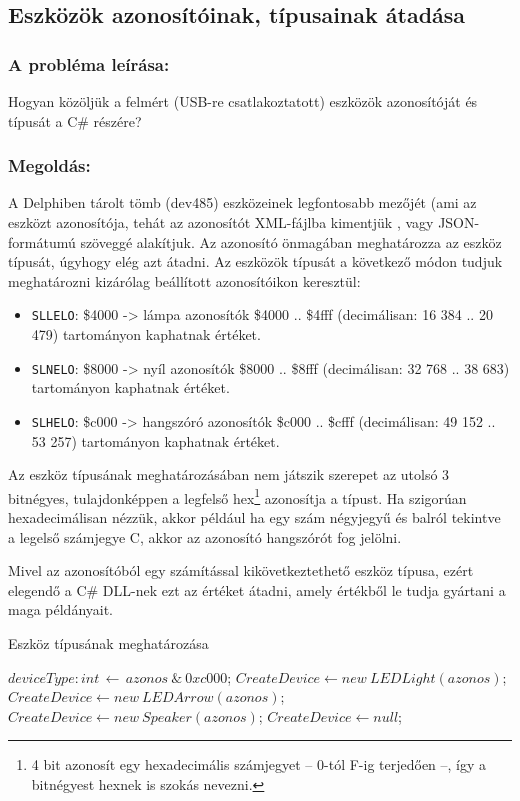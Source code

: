 \documentclass[tocnopagenum]{thesis-ekf}
\theoremstyle{definition}
\theoremstyle{remark}
\begin{document}
	\subsection{Eszközök azonosítóinak, típusainak átadása}
	\subsubsection{A probléma leírása:} Hogyan közöljük a felmért (USB-re csatlakoztatott) eszközök azonosítóját és típusát a C\# részére?
	\subsubsection{Megoldás:}
	A Delphiben tárolt tömb (dev485) eszközeinek legfontosabb mezőjét (ami az eszközt azonosítója, tehát az azonosítót XML-fájlba kimentjük \cite{sof_xmlcreate}, vagy JSON-formátumú szöveggé alakítjuk. Az azonosító önmagában meghatározza az eszköz típusát, úgyhogy elég azt átadni.
	Az eszközök típusát a következő módon tudjuk meghatározni kizárólag beállított azonosítóikon keresztül:
	\begin{itemize}
		\item \verb*|SLLELO|: \$4000 -> lámpa azonosítók \$4000 .. \$4fff (decimálisan: 16 384 .. 20 479) tartományon kaphatnak értéket.
		\item \verb*|SLNELO|: \$8000 -> nyíl azonosítók \$8000 .. \$8fff (decimálisan: 32 768 .. 38 683) tartományon kaphatnak értéket.
		\item \verb*|SLHELO|: \$c000 -> hangszóró azonosítók \$c000 .. \$cfff (decimálisan: 49 152 .. 53 257) tartományon kaphatnak értéket.
	\end{itemize}
	
	Az eszköz típusának meghatározásában nem játszik szerepet az utolsó 3 bitnégyes, tulajdonképpen a legfelső hex\footnote{4 bit azonosít egy hexadecimális számjegyet -- 0-tól F-ig terjedően --, így a bitnégyest hexnek is szokás nevezni.} azonosítja a típust.
	Ha szigorúan hexadecimálisan nézzük, akkor például ha egy szám négyjegyű és balról tekintve a legelső számjegye C, akkor az azonosító hangszórót fog jelölni.
	
	Mivel az azonosítóból egy számítással kikövetkeztethető eszköz típusa, ezért elegendő a C\# DLL-nek ezt az értéket átadni, amely értékből le tudja gyártani a maga példányait.
	\begin{algorithm}
		\caption{Eszköz típusának meghatározása}
		\label{algo:createdevice}
		\begin{algorithmic}[0]
			\State $deviceType:int\,\gets\,azonos\ \mathbin{\&}\ 0xc000$; 
				\State $CreateDevice \gets new\ LEDLight(azonos)$;
				\State $CreateDevice \gets new\ LEDArrow(azonos)$;
				\State $CreateDevice \gets new\ Speaker(azonos)$;
			\Else
				\State $CreateDevice \gets null$;
			\EndIf
		\EndFunction
		\end{algorithmic}
	\end{algorithm}
\end{document}
